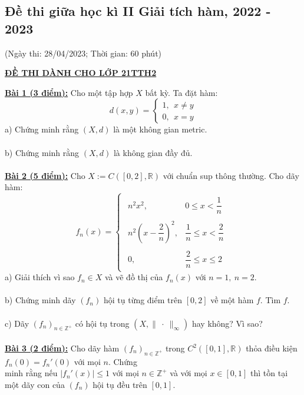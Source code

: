 \documentclass[10pt, a4paper]{article}
\begin{document}
\subsection{Đề thi giữa học kì II Giải tích hàm, 2022 - 2023}
\begin{center}
	\color{blue}(Ngày thi: 28/04/2023; Thời gian: 60 phút)
\end{center}
\begin{center}
	\color{blue}\underline{\textbf{ĐỀ THI DÀNH CHO LỚP 21TTH2}}
\end{center}
\color{red}\underline{\textbf{Bài 1 (3 điểm):}} \color{black}Cho một tập hợp $X$ bất kỳ. Ta đặt hàm: $$d(x,y)=\begin{cases}
	1,~~x\ne y\\
	0,~~x=y
\end{cases}$$
\color{red}a) \color{black}Chứng minh rằng $(X,d)$ là một không gian metric.\\\\
\color{red}b) \color{black}Chứng minh rằng $(X,d)$ là không gian đầy đủ.\\\\
\color{red}\underline{\textbf{Bài 2 (5 điểm):}} \color{black}Cho $X:=C([0,2],\mathbb R)$ với chuẩn sup thông thường. Cho dãy hàm: $$f_n(x)=\begin{cases}
\begin{array}{ll}
n^2x^2, & 0\le x<\dfrac1n\\\\
n^2\left(x-\dfrac2n\right)^2, & \dfrac1n\le x<\dfrac2n\\\\
0, & \dfrac2n\le x\le2
\end{array}
\end{cases}$$
\color{red}a) \color{black}Giải thích vì sao $f_n\in X$ và vẽ đồ thị của $f_n(x)$ với $n=1,~n=2$.\\\\
\color{red}b) \color{black}Chứng minh dãy $(f_n)$ hội tụ từng điểm trên $[0,2]$ về một hàm $f$. Tìm $f$.\\\\
\color{red}c) \color{black}Dãy $(f_n)_{n\in\mathbb Z^+}$ có hội tụ trong $\left(X,\lVert~\cdot~\rVert_\infty\right)$ hay không? Vì sao?\\\\
\color{red}\underline{\textbf{Bài 3 (2 điểm):}} \color{black}Cho dãy hàm $(f_n)_{n\in\mathbb Z^+}$ trong $C^2([0,1],\mathbb R)$ thỏa điều kiện $f_n(0)=f_n'(0)$ với mọi $n$. Chứng\\ minh rằng nếu $|f_n'(x)|\le1$ với mọi $n\in\mathbb Z^+$ và với mọi $x\in[0,1]$ thì tồn tại một dãy con của $(f_n)$ hội tụ đều trên $[0,1]$.
\end{document}
